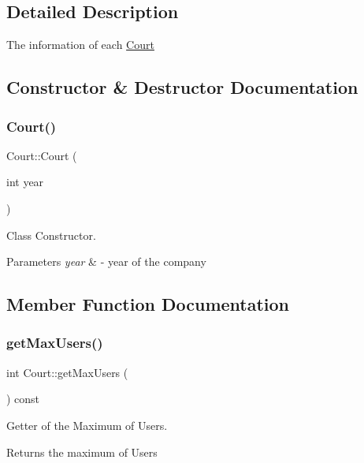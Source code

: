 \subsection{Detailed Description}
The information of each \mbox{\hyperlink{class_court}{Court}} 

\subsection{Constructor \& Destructor Documentation}
\mbox{\label{class_court_a594463e426e762163a09290e48d1d437}} 
\subsubsection{\texorpdfstring{Court()}{Court()}}
{\footnotesize\ttfamily Court\+::\+Court (\begin{DoxyParamCaption}\item[{int}]{year }\end{DoxyParamCaption})}



Class Constructor. 


\begin{DoxyParams}{Parameters}
{\em year} & -\/ year of the company \\
\hline
\end{DoxyParams}


\subsection{Member Function Documentation}
\mbox{\label{class_court_a9992ef2a5d2ee81e8cc7f24f8c917f31}} 
\subsubsection{\texorpdfstring{get\+Max\+Users()}{getMaxUsers()}}
{\footnotesize\ttfamily int Court\+::get\+Max\+Users (\begin{DoxyParamCaption}{ }\end{DoxyParamCaption}) const}



Getter of the Maximum of Users. 

\begin{DoxyReturn}{Returns}
the maximum of Users 
\end{DoxyReturn}
\mbox{\label{class_court_ae08f3e2f1119073fffc251fc1e725550}} 
